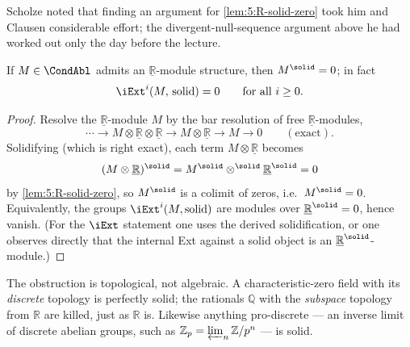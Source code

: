 \begin{remark}
\label{rmk:5:R-argument-history}
Scholze noted that finding an argument for \cref{lem:5:R-solid-zero} took him and
Clausen considerable effort; the divergent-null-sequence argument above he had
worked out only the day before the lecture.
\end{remark}

\begin{corollary}
\label{cor:5:R-modules-killed}
If $M\in\CondAbl$ admits an $\underline{\mathbb{R}}$-module structure, then
$M^{\solid}=0$; in fact
\begin{equation*}
\iExt^{i}(M,\,\text{solid})=0\qquad\text{for all }i\ge0 .
\end{equation*}
\end{corollary}

\begin{proof}
Resolve the $\underline{\mathbb{R}}$-module $M$ by the bar resolution of free
$\underline{\mathbb{R}}$-modules,
\begin{equation*}
\cdots\longrightarrow M\otimes\underline{\mathbb{R}}\otimes\underline{\mathbb{R}}
\longrightarrow M\otimes\underline{\mathbb{R}}\longrightarrow M\longrightarrow0
\qquad(\text{exact}).
\end{equation*}
Solidifying (which is right exact), each term $M\otimes\underline{\mathbb{R}}$
becomes
\[
(M\otimes\underline{\mathbb{R}})^{\solid}
=M^{\solid}\otimes^{\solid}\underline{\mathbb{R}}^{\solid}=0
\]
by \cref{lem:5:R-solid-zero}, so $M^{\solid}$ is a colimit of zeros, i.e.\
$M^{\solid}=0$. Equivalently, the groups $\iExt^{i}(M,\text{solid})$ are modules
over $\underline{\mathbb{R}}^{\solid}=0$, hence vanish. (For the $\iExt$ statement
one uses the derived solidification, or one observes directly that the internal
Ext against a solid object is an $\underline{\mathbb{R}}^{\solid}$-module.)
\end{proof}

\begin{remark}
\label{rmk:5:topology-not-field}
The obstruction is topological, not algebraic. A characteristic-zero field with
its \emph{discrete} topology is perfectly solid; the rationals $\mathbb{Q}$ with
the \emph{subspace} topology from $\mathbb{R}$ are killed, just as $\mathbb{R}$
is. Likewise anything pro-discrete --- an inverse limit of discrete abelian
groups, such as $\mathbb{Z}_p=\varprojlim_n\mathbb{Z}/p^n$ --- is solid.
\end{remark}

